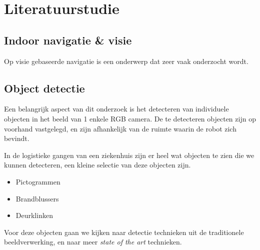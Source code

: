 
\chapter{Literatuurstudie}

\section{Indoor navigatie \& visie}
        Op visie gebaseerde navigatie is een onderwerp dat zeer vaak onderzocht wordt.
        
    \section{Object detectie}

        Een belangrijk aspect van dit onderzoek is het detecteren van individuele objecten in het beeld van 1 enkele RGB camera.
        De te detecteren objecten zijn op voorhand vastgelegd, en zijn afhankelijk van de ruimte waarin de robot zich bevindt.

        In de logistieke gangen van een ziekenhuis zijn er heel wat objecten te zien die we kunnen detecteren, een kleine selectie van deze objecten zijn.

        \begin{itemize}
            \item Pictogrammen
            \item Brandblussers
            \item Deurklinken
        \end{itemize}

        Voor deze objecten gaan we kijken naar detectie technieken uit de traditionele beeldverwerking, en naar meer \textit{state of the art} technieken. 


